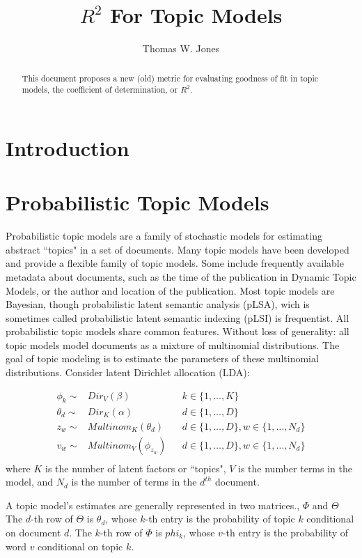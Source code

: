 \documentclass[12pt]{amsart}
\title{$R^2$ For Topic Models}
\author{Thomas W. Jones}
\begin{document}
\maketitle

\begin{abstract}
This document proposes a new (old) metric for evaluating goodness of fit in topic models, the coefficient of determination, or $R^2$.
\end{abstract}

\section{Introduction}

\section{Probabilistic Topic Models}
Probabilistic topic models are a family of stochastic models for estimating abstract ``topics" in a set of documents. Many topic models have been developed and provide a flexible family of topic models. Some include frequently available metadata about documents, such as the time of the publication in Dynamic Topic Models, or the author and location of the publication. Most topic models are Bayesian, though probabilistic latent semantic analysis (pLSA), wich is sometimes called probabilistic latent semantic indexing (pLSI) is frequentist. All probabilistic topic models share common features. Without loss of generality: all topic models model documents as a mixture of multinomial distributions. The goal of topic modeling is to estimate the parameters of these multinomial distributions. Consider latent Dirichlet allocation (LDA): 

\begin{align*}
\phi_k \sim& Dir_V(\beta) && k\in\{1, \ldots, K\} \\
{\theta}_d \sim& Dir_K({\alpha}) && d\in\{1, \ldots, D\}\\
z_w \sim& Multinom_K({\theta}_d) && d\in \{1, \ldots, D\}, w\in\{1,\ldots, N_d\}\\
v_w \sim& Multinom_V({\phi}_{z_w}) && d\in \{1, \ldots, D\}, w\in\{1,\ldots,N_d\}\\
\end{align*} where $K$ is the number of latent factors or ``topics", $V$ is the number terms in the model, and $N_d$ is the number of terms in the $d^{th}$ document. 

A topic model's estimates are generally represented in two matrices., $\Phi$ and $\Theta$ The $d$-th row of $\Theta$ is $\theta_d$, whose $k$-th entry is the probability of topic $k$ conditional on document $d$. The $k$-th row of $\Phi$ is $phi_k$, whose $v$-th entry is the probability of word $v$ conditional on topic $k$. 
\end{document}
